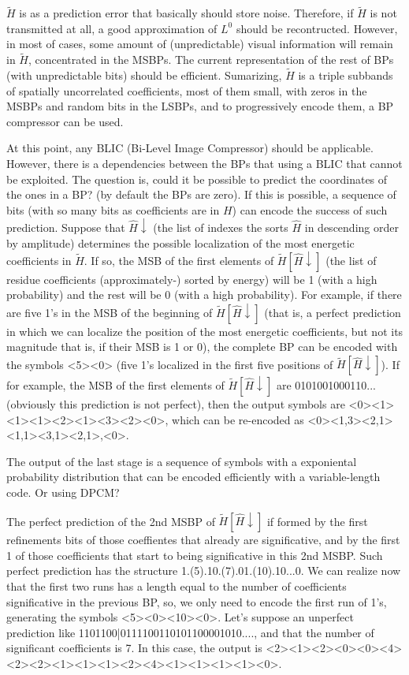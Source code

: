 $\tilde{H}$ is as a prediction error that basically should store
noise. Therefore, if $\tilde{H}$ is not transmitted at all, a good
approximation of $L^0$ should be recontructed. However, in most of
cases, some amount of (unpredictable) visual information will remain
in $\tilde{H}$, concentrated in the MSBPs. The current representation
of the rest of BPs (with unpredictable bits) should be
efficient. Sumarizing, $\tilde{H}$ is a triple subbands of spatially
uncorrelated coefficients, most of them small, with zeros in the MSBPs
and random bits in the LSBPs, and to progressively encode them, a BP
compressor can be used.

At this point, any BLIC (Bi-Level Image Compressor) should be
applicable. However, there is a dependencies between the BPs that
using a BLIC that cannot be exploited. The question is, could it be
possible to predict the coordinates of the ones in a BP? (by default
the BPs are zero). If this is possible, a sequence of bits (with so
many bits as coefficients are in $H$) can encode the success of such
prediction. Suppose that $\hat{H}\downarrow$ (the list of indexes the
sorts $\hat{H}$ in descending order by amplitude) determines the
possible localization of the most energetic coefficients in
$\tilde{H}$. If so, the MSB of the first elements of
$\tilde{H}[\hat{H}\downarrow]$ (the list of residue coefficients
(approximately-) sorted by energy) will be 1 (with a high probability)
and the rest will be 0 (with a high probability). For example, if
there are five 1's in the MSB of the beginning of
$\tilde{H}[\hat{H}\downarrow]$ (that is, a perfect prediction in which
we can localize the position of the most energetic coefficients, but
not its magnitude that is, if their MSB is 1 or 0), the complete BP
can be encoded with the symbols <5><0> (five 1's localized in the
first five positions of $\tilde{H}[\hat{H}\downarrow]$). If for
example, the MSB of the first elements of
$\tilde{H}[\hat{H}\downarrow]$ are 0101001000110... (obviously this
prediction is not perfect), then the output symbols are
<0><1><1><1><2><1><3><2><0>, which can be re-encoded as
<0><1,3><2,1><1,1><3,1><2,1>,<0>.

The output of the last stage is a sequence of symbols with a
exponiental probability distribution that can be encoded efficiently
with a variable-length code. Or using DPCM?

The perfect prediction of the 2nd MSBP of
$\tilde{H}[\hat{H}\downarrow]$ if formed by the first refinements bits
of those coeffientes that already are significative, and by the first
1 of those coefficients that start to being significative in this 2nd
MSBP. Such perfect prediction has the structure
1.(5).10.(7).01.(10).10...0. We can realize now that the first two
runs has a length equal to the number of coefficients significative in
the previous BP, so, we only need to encode the first run of 1's,
generating the symbols <5><0><10><0>. Let's suppose an unperfect
prediction like 1101100|0111100110101100001010...., and that the
number of significant coefficients is 7. In this case, the output is
<2><1><2><0><0><4><2><2><1><1><1><2><4><1><1><1><1><0>.

